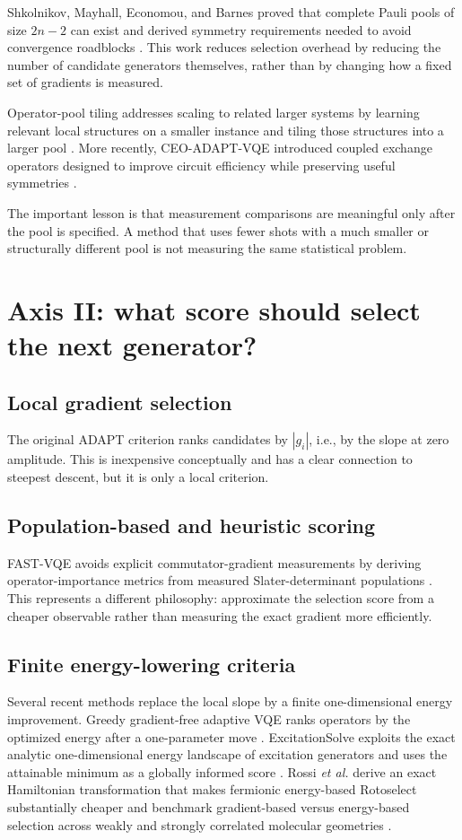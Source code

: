 \documentclass[11pt]{article}
\begin{document}
Shkolnikov, Mayhall, Economou, and Barnes proved that complete Pauli pools of size $2n-2$ can exist and derived symmetry requirements needed to avoid convergence roadblocks \cite{Shkolnikov2023}. This work reduces selection overhead by reducing the number of candidate generators themselves, rather than by changing how a fixed set of gradients is measured.

Operator-pool tiling addresses scaling to related larger systems by learning relevant local structures on a smaller instance and tiling those structures into a larger pool \cite{VanDyke2024}. More recently, CEO-ADAPT-VQE introduced coupled exchange operators designed to improve circuit efficiency while preserving useful symmetries \cite{Ramoa2025CEO}.

The important lesson is that measurement comparisons are meaningful only after the pool is specified. A method that uses fewer shots with a much smaller or structurally different pool is not measuring the same statistical problem.

\section{Axis II: what score should select the next generator?}

\subsection{Local gradient selection}
The original ADAPT criterion ranks candidates by $|g_i|$, i.e., by the slope at zero amplitude. This is inexpensive conceptually and has a clear connection to steepest descent, but it is only a local criterion.

\subsection{Population-based and heuristic scoring}
FAST-VQE avoids explicit commutator-gradient measurements by deriving operator-importance metrics from measured Slater-determinant populations \cite{Majland2023}. This represents a different philosophy: approximate the selection score from a cheaper observable rather than measuring the exact gradient more efficiently.

\subsection{Finite energy-lowering criteria}
Several recent methods replace the local slope by a finite one-dimensional energy improvement. Greedy gradient-free adaptive VQE ranks operators by the optimized energy after a one-parameter move \cite{Feniou2025}. ExcitationSolve exploits the exact analytic one-dimensional energy landscape of excitation generators and uses the attainable minimum as a globally informed score \cite{Jager2025}. Rossi \emph{et al.} derive an exact Hamiltonian transformation that makes fermionic energy-based Rotoselect substantially cheaper and benchmark gradient-based versus energy-based selection across weakly and strongly correlated molecular geometries \cite{Rossi2026}.
\end{document}
